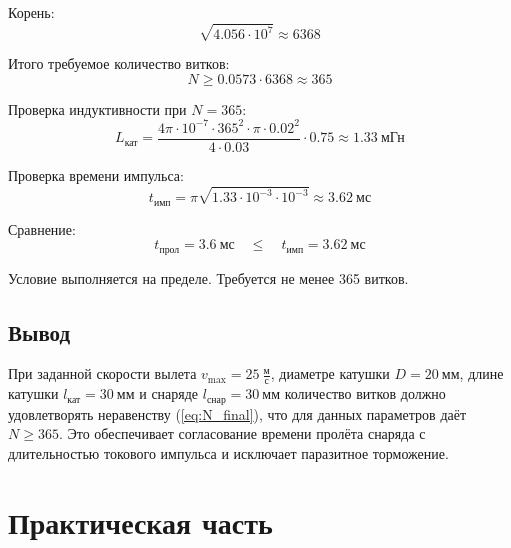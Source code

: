 \documentclass[14pt]{extarticle}
\begin{document}
Корень:
\begin{equation}
    \sqrt{4.056 \cdot 10^{7}} \approx 6368
\end{equation}

Итого требуемое количество витков:
\begin{equation}
    N \ge 0.0573 \cdot 6368 \approx 365
\end{equation}

Проверка индуктивности при $N = 365$:
\begin{equation}
    L_{\text{кат}} = \frac{4\pi \cdot 10^{-7} \cdot 365^2 \cdot \pi \cdot 0.02^2}{4 \cdot 0.03} \cdot 0.75 \approx 1.33 \ \text{мГн}
\end{equation}

Проверка времени импульса:
\begin{equation}
    t_{\text{имп}} = \pi \sqrt{1.33 \cdot 10^{-3} \cdot 10^{-3}} \approx 3.62 \ \text{мс}
\end{equation}

Сравнение:
\begin{equation}
    t_{\text{прол}} = 3.6 \ \text{мс} \quad \le \quad t_{\text{имп}} = 3.62 \ \text{мс}
\end{equation}

Условие выполняется на пределе. Требуется не менее 365 витков.

\subsection{Вывод}
При заданной скорости вылета $v_{\max} = 25 \ \frac{\text{м}}{\text{с}}$, диаметре катушки $D = 20 \ \text{мм}$, длине катушки $l_{\text{кат}} = 30 \ \text{мм}$ и снаряде $l_{\text{снар}} = 30 \ \text{мм}$ количество витков должно удовлетворять неравенству (\ref{eq:N_final}), что для данных параметров даёт $N \ge 365$. Это обеспечивает согласование времени пролёта снаряда с длительностью токового импульса и исключает паразитное торможение.

\newpage
\section{Практическая часть}
\end{document}
